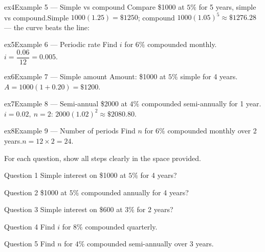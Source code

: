 \documentclass[11pt]{article}
\begin{document}
\begin{example}{ex4}{Example 5 --- Simple vs compound}
Compare \$1000 at $5\%$ for 5 years, simple vs compound.\soln Simple $1000(1.25)=\$1250$; compound $1000(1.05)^5\approx\$1276.28$ — the curve beats the line:
\end{example}

\begin{example}{ex5}{Example 6 --- Periodic rate}
Find $i$ for $6\%$ compounded monthly.\soln $i=\dfrac{0.06}{12}=0.005$.
\end{example}

\begin{example}{ex6}{Example 7 --- Simple amount}
Amount: \$1000 at $5\%$ simple for 4 years.\soln $A=1000(1+0.20)=\$1200$.
\end{example}

\begin{example}{ex7}{Example 8 --- Semi-annual}
\$2000 at $4\%$ compounded semi-annually for 1 year.\soln $i=0.02,\ n=2$: $2000(1.02)^2\approx\$2080.80$.
\end{example}

\begin{example}{ex8}{Example 9 --- Number of periods}
Find $n$ for $6\%$ compounded monthly over 2 years.\soln $n=12\times2=24$.
\end{example}

\clearpage
{}
For each question, show all steps clearly in the space provided.

\begin{qbox}{Question 1}
Simple interest on \$1000 at $5\%$ for 4 years?\workspace{2.4cm}
\end{qbox}

\begin{qbox}{Question 2}
\$1000 at $5\%$ compounded annually for 4 years?\workspace{2.4cm}
\end{qbox}

\begin{qbox}{Question 3}
Simple interest on \$600 at $3\%$ for 2 years?\workspace{2.4cm}
\end{qbox}

\begin{qbox}{Question 4}
Find $i$ for $8\%$ compounded quarterly.\workspace{2.4cm}
\end{qbox}

\begin{qbox}{Question 5}
Find $n$ for $4\%$ compounded semi-annually over 3 years.\workspace{2.4cm}
\end{qbox}
\end{document}
